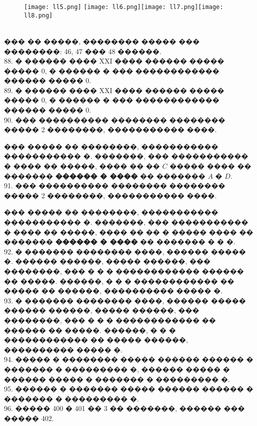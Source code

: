 \documentclass[12pt]{article}
\begin{document}
\begin{figure}[ht!]\texttt{[image: ll5.png]} \texttt{[image: ll6.png]}\texttt{[image: ll7.png]}\texttt{[image: ll8.png]}
\end{figure}\\
��� �� �����, �������� ����� ��� ��������: 46, 47 ��� 48 ������.\\
88. � ������ ���� XXI ���� ������ ����� ����� 0, � ������ � ��� ������������ ������ ����� 0.\\
89. � ������ ���� XXI ���� ������ ����� ����� 0, � ������ � ��� ������������ ������ ����� 0.\\
90. ��� ���������� �������� �������� ����� 2 ��������, ����������� ����.
\begin{center}
\begin{figure}[ht!]
\end{figure}
\end{center}
��� ����� �� ��������, ����������� ����������� �. �������, ��� ����������� � ���� �� �����, ���� �� �� $C$ ����� ���� �� ������� {\bf ������ � ����} �� ������� $A$ � $D.$\\
91. ��� ���������� �������� �������� ����� 2 ��������, ����������� ����.
\begin{center}
\begin{figure}[ht!]
\end{figure}
\end{center}
��� ����� �� ��������, ����������� ����������� �. �������, ��� ����������� � ���� �� �����, ���� �� �� � ����� ���� �� ������� {\bf ������ � ����} �� ������� � � �.\\
92. � ������� �������� ����, ������ ����� �. ������ ������, ����� ������, ��� ��������, ��� � � � ������������ ������ �� �����. ������, � � � ������������ �� ����� �� ������, ���������� ����� �.\\
93. � ������� �������� ����, ������ ����� ������ ������, ����� ������, ��� ��������, ��� � � � ������������ �� ������ �� �����. ������, � � � ������������ �� ����� ������, ���������� ����� �.\\
94. ����� � �������� ����� ������ ������ � ������� � ��������� �, ������ ����� � ������ ����� � ������� � ��������� �.\\
95. ������ � ������� ����� ������ ������ � ������� � ��������� �.\\
96. ����� 400 � 401 �� 3 �� �������, ������ ��� ����� 402.\\
\end{document}

